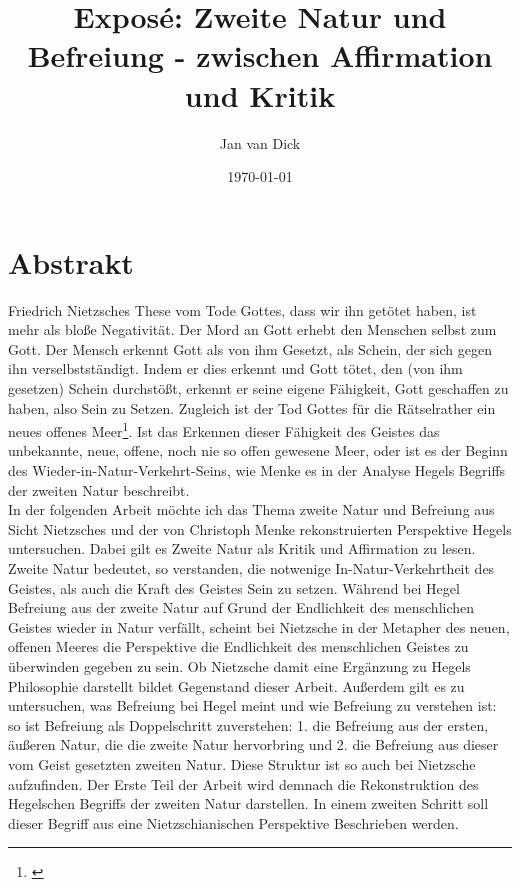 \documentclass[a4paper, 12pt]{article}
\title{Exposé: \glqq Zweite Natur und Befreiung - zwischen Affirmation und Kritik\grqq}
\author{Jan van Dick}
\date{\today}
\begin{document}
\maketitle

\section{Abstrakt}
Friedrich Nietzsches These vom Tode Gottes, dass \glqq wir\grqq{} ihn getötet haben, ist mehr als bloße Negativität. 
Der Mord an Gott erhebt den Menschen selbst zum Gott.
Der Mensch erkennt Gott als von ihm Gesetzt, als Schein, der sich gegen ihn verselbstständigt. 
Indem er dies erkennt und Gott tötet, den (von ihm gesetzen) Schein durchstößt, erkennt er seine eigene Fähigkeit, Gott geschaffen zu haben, also Sein zu Setzen.
Zugleich ist der Tod Gottes für die \glqq Rätselrather\grqq{} ein \glqq neues offenes Meer\grqq \footnote{\citeauthor[Vgl.][573]{nietzsche_morgenrote_1999}}.
Ist das Erkennen dieser Fähigkeit des Geistes das unbekannte, neue, offene, noch nie so offen gewesene Meer, oder ist es der Beginn des Wieder-in-Natur-Verkehrt-Seins, wie Menke es in der Analyse Hegels Begriffs der zweiten Natur beschreibt.\\
In der folgenden Arbeit möchte ich das Thema zweite Natur und Befreiung aus Sicht Nietzsches und der von Christoph Menke rekonstruierten Perspektive Hegels untersuchen.
Dabei gilt es Zweite Natur als Kritik und Affirmation zu lesen. 
Zweite Natur bedeutet, so verstanden, die notwenige In-Natur-Verkehrtheit des Geistes, als auch die Kraft des Geistes Sein zu setzen. 
Während bei Hegel Befreiung aus der zweite Natur auf Grund der Endlichkeit des menschlichen Geistes wieder in Natur verfällt, scheint bei Nietzsche in der Metapher des neuen, offenen Meeres die Perspektive die Endlichkeit des menschlichen Geistes zu überwinden gegeben zu sein. 
Ob Nietzsche damit eine Ergänzung zu Hegels Philosophie darstellt bildet Gegenstand dieser Arbeit. 
Außerdem gilt es zu untersuchen, was Befreiung bei Hegel meint und wie Befreiung zu verstehen ist:
so ist Befreiung als Doppelschritt zuverstehen: 1. die Befreiung aus der ersten, äußeren Natur, die die zweite Natur hervorbring und 2. die Befreiung aus dieser vom Geist gesetzten zweiten Natur.
Diese Struktur ist so auch bei Nietzsche aufzufinden. 
Der Erste Teil der Arbeit wird demnach die Rekonstruktion des Hegelschen Begriffs der zweiten Natur darstellen. 
In einem zweiten Schritt soll dieser Begriff aus eine Nietzschianischen Perspektive Beschrieben werden. 
\end{document}
